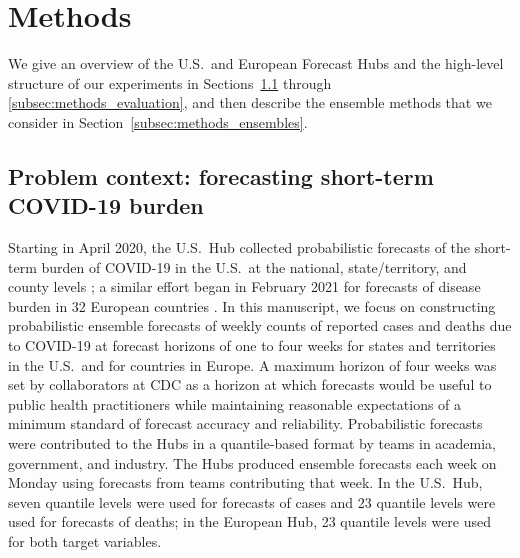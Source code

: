\documentclass[11pt,3p,authoryear]{elsarticle}
\begin{document}
\section{Methods}

We give an overview of the U.S.\ and European Forecast Hubs and the high-level structure of our experiments in Sections~\ref{subsec:methods_context} through \ref{subsec:methods_evaluation}, and then describe the ensemble methods that we consider in Section~\ref{subsec:methods_ensembles}.

\subsection{Problem context: forecasting short-term COVID-19 burden}
\label{subsec:methods_context}

Starting in April 2020, the U.S.\ Hub collected probabilistic forecasts of the short-term burden of COVID-19 in the U.S.\ at the national, state/territory, and county levels \citep{cramer_united_2021}; a similar effort began
in February 2021 for forecasts of disease burden in 32 European countries \citep{EuropeanCovid19Forecast}.
In this manuscript, we focus on constructing probabilistic ensemble forecasts of weekly counts of reported cases and deaths due to COVID-19 at forecast horizons of one to four weeks for states and territories in the U.S.\ and for countries in Europe.
A maximum horizon of four weeks was set by collaborators at CDC as a horizon at which forecasts would be useful to public health practitioners while maintaining reasonable expectations of a minimum standard of forecast accuracy and reliability.
Probabilistic forecasts were contributed to the Hubs in a quantile-based format by teams in academia, government, and industry.
The Hubs produced ensemble forecasts each week on Monday using forecasts from teams contributing that week.
In the U.S.\ Hub, seven quantile levels were used for forecasts of cases and 23 quantile levels were used for forecasts of deaths; in the European Hub, 23 quantile levels were used for both target variables. %
\end{document}
